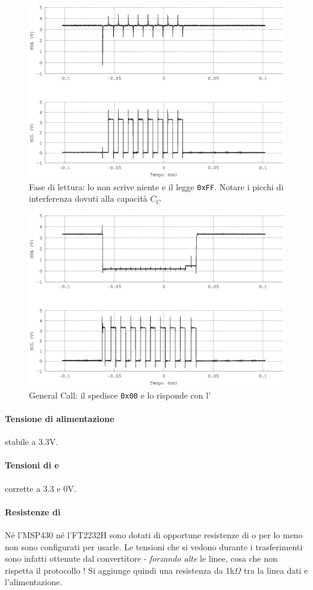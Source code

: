 \begin{figure}
\centering
  \includegraphics[width=.5\textwidth]{LetturaNero}
	\caption{Fase di lettura: lo \slave{} non scrive niente e il \master{} legge \texttt{0xFF}. Notare i picchi di interferenza dovuti alla capacità $C_C$}
    \label{fig:i2c_lettura}
\end{figure}

\begin{figure}
\centering
  \includegraphics[width=.5\textwidth]{GeneralCallNero}
	\caption{General Call: il \master{} spedisce \texttt{0x00} e lo \slave{} risponde con l'\Ack{}}
    \label{fig:i2c_generalcall}
\end{figure}

\paragraph{Tensione di alimentazione}
	stabile a 3.3V.
    
\paragraph{Tensioni di {\sda} e {\scl}}
	corrette a 3.3 e 0V.

\paragraph{Resistenze di {\pullup}}
Né l'{MSP430} né l'{FT2232H}
sono dotati di opportune resistenze di {\pullup}
o per lo meno non sono configurati per usarle.
Le tensioni che si vedono durante i trasferimenti
sono infatti ottenute dal convertitore {\iic}-{\usb}
\emph{forzando alte} le linee,
cosa che non rispetta il protocollo {\iic}!
Si aggiunge quindi una resistenza da 1k$\Omega$
tra la linea dati e l'alimentazione.

